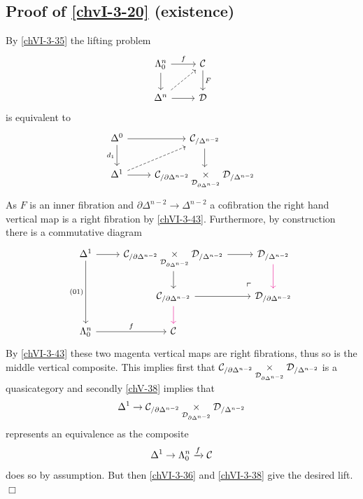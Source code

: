     \subsection{Proof of \ref{chvI-3-20} (existence)}
        By \ref{chVI-3-35} the lifting problem
        \begin{equation*}
            \begin{tikzcd}
                \horn{n}{0} \arrow[d] \arrow[r, "f"] & \Cc \arrow[d, "F"] \\
                \Delta^n \arrow[ru, dashed] \arrow[r] & \Dd
            \end{tikzcd}	
        \end{equation*}	
        is equivalent to
        \begin{equation*}
            \begin{tikzcd}
                \Delta^0 \arrow[d, "d_1"'] \arrow[r] & \Cc_{/ \Delta^{n-2}} \arrow[d] \\
                \Delta^1 \arrow[ru, dashed] \arrow[r] & \Cc_{/ \partial \Delta^{n-2}} \underset{\Dd_{\partial \Delta^{n-2}}}{\times} \Dd_{/ \Delta^{n-2}}
            \end{tikzcd}	
        \end{equation*}
        As $F$ is an inner fibration and $\partial \Delta^{n-2} \to \Delta^{n-2}$ a cofibration the right hand vertical map is a right fibration by \ref{chVI-3-43}. Furthermore, by construction there is a commutative diagram
        \begin{equation*}
            \begin{tikzcd}
                \Delta^1 \arrow[dd, "(01)"'] \arrow[r] & \Cc_{/ \partial \Delta^{n-2}} \underset{\Dd_{\partial \Delta^{n-2}}}{\times} \Dd_{/ \Delta^{n-2}} \arrow[d] \arrow[r] \arrow[rd, phantom, "\ulcorner" very near end] & \Dd_{/ \Delta^{n-2}} \arrow[d, color=magenta] \\
                & \Cc_{/ \partial \Delta^{n-2}} \arrow[d, color=magenta] \arrow[r] & \Dd_{/ \partial \Delta^{n-2}} \\
                \horn{n}{0} \arrow[r, "f"] & \Cc &
            \end{tikzcd}
        \end{equation*}
        By \ref{chVI-3-43} these two magenta vertical maps are right fibrations, thus so is the middle vertical composite. This implies first that $\mathcal{C}_{/ \partial \Delta^{n-2}} \underset{\mathcal{D}_{\partial \Delta^{n-2}}}{\times} \mathcal{D}_{/ \Delta^{n-2}}$ is a quasicategory and secondly \ref{chV-38} implies that
        \begin{equation*}
            \Delta^1 \to \mathcal{C}_{/ \partial \Delta^{n-2}} \underset{\mathcal{D}_{\partial \Delta^{n-2}}}{\times} \mathcal{D}_{/ \Delta^{n-2}}
        \end{equation*}
        represents an equivalence as the composite
        \begin{equation*}
            \Delta^1 \to \Lambda^{n}_{0} \xrightarrow{f} \mathcal{C}
        \end{equation*}
        does so by assumption. But then \ref{chVI-3-36} and \ref{chVI-3-38} give the desired lift.\hfill$\Box$
        \medskip

